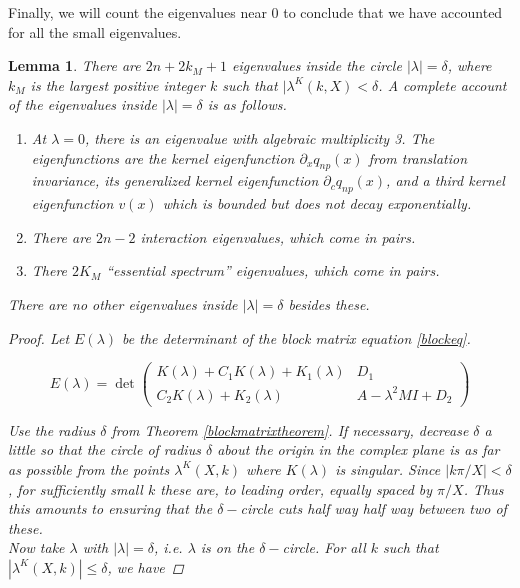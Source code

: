 \documentclass[12pt]{article}
\newtheorem{lemma}{Lemma}
\begin{document}
Finally, we will count the eigenvalues near 0 to conclude that we have accounted for all the small eigenvalues.  

\begin{lemma}\label{eigcount}
There are $2n + 2 k_M + 1$ eigenvalues inside the circle $|\lambda| = \delta$, where $k_M$ is the largest positive integer $k$ such that $|\lambda^K(k,X) < \delta$. A complete account of the eigenvalues inside $|\lambda| = \delta$ is as follows.
\begin{enumerate}
	\item At $\lambda = 0$, there is an eigenvalue with algebraic multiplicity 3. The eigenfunctions are the kernel eigenfunction $\partial_x q_{np}(x)$ from translation invariance, its generalized kernel eigenfunction $\partial_c q_{np}(x)$, and a third kernel eigenfunction $v(x)$ which is bounded but does not decay exponentially.
	\item There are $2n - 2$ interaction eigenvalues, which come in pairs.
	\item There $2 K_M$ ``essential spectrum'' eigenvalues, which come in pairs.
\end{enumerate}
There are no other eigenvalues inside $|\lambda| = \delta$ besides these.

\begin{proof}
Let $E(\lambda)$ be the determinant of the block matrix equation \ref{blockeq}.

\begin{equation}
E(\lambda) = \det 
\begin{pmatrix}
K(\lambda) + C_1 K(\lambda) + K_1(\lambda) & D_1 \\
C_2 K(\lambda) + K_2(\lambda) & A - \lambda^2 MI + D_2
\end{pmatrix}
\end{equation}

Use the radius $\delta$ from Theorem \ref{blockmatrixtheorem}. If necessary, decrease $\delta$ a little so that the circle of radius $\delta$ about the origin in the complex plane is as far as possible from the points $\lambda^K(X, k)$ where $K(\lambda)$ is singular. Since $|k\pi/X| < \delta$, for sufficiently small $k$ these are, to leading order, equally spaced by $\pi /X$. Thus this amounts to ensuring that the $\delta-$circle cuts half way half way between two of these. \\

Now take $\lambda$ with $|\lambda| = \delta$, i.e. $\lambda$ is on the $\delta-$circle. For all $k$ such that $|\lambda^K(X, k)| \leq \delta$, we have


\end{proof}
\end{lemma}
\end{document}
